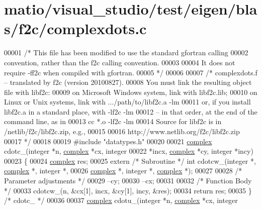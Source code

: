 \hypertarget{matio_2visual__studio_2test_2eigen_2blas_2f2c_2complexdots_8c_source}{}\section{matio/visual\+\_\+studio/test/eigen/blas/f2c/complexdots.c}
\label{matio_2visual__studio_2test_2eigen_2blas_2f2c_2complexdots_8c_source}

\begin{DoxyCode}
00001 \textcolor{comment}{/* This file has been modified to use the standard gfortran calling}
00002 \textcolor{comment}{   convention, rather than the f2c calling convention.}
00003 \textcolor{comment}{}
00004 \textcolor{comment}{   It does not require -ff2c when compiled with gfortran.}
00005 \textcolor{comment}{*/}
00006 
00007 \textcolor{comment}{/* complexdots.f -- translated by f2c (version 20100827).}
00008 \textcolor{comment}{   You must link the resulting object file with libf2c:}
00009 \textcolor{comment}{    on Microsoft Windows system, link with libf2c.lib;}
00010 \textcolor{comment}{    on Linux or Unix systems, link with .../path/to/libf2c.a -lm}
00011 \textcolor{comment}{    or, if you install libf2c.a in a standard place, with -lf2c -lm}
00012 \textcolor{comment}{    -- in that order, at the end of the command line, as in}
00013 \textcolor{comment}{        cc *.o -lf2c -lm}
00014 \textcolor{comment}{    Source for libf2c is in /netlib/f2c/libf2c.zip, e.g.,}
00015 \textcolor{comment}{}
00016 \textcolor{comment}{        http://www.netlib.org/f2c/libf2c.zip}
00017 \textcolor{comment}{*/}
00018 
00019 \textcolor{preprocessor}{#include "datatypes.h"}
00020 
00021 \hyperlink{structcomplex}{complex} cdotc\_(integer *n, \hyperlink{structcomplex}{complex} *cx, integer 
00022     *incx, \hyperlink{structcomplex}{complex} *cy, integer *incy)
00023 \{
00024     \hyperlink{structcomplex}{complex} res;
00025     \textcolor{keyword}{extern} \textcolor{comment}{/* Subroutine */} \textcolor{keywordtype}{int} cdotcw\_(integer *, \hyperlink{structcomplex}{complex} *, integer *, 
00026         \hyperlink{structcomplex}{complex} *, integer *, \hyperlink{structcomplex}{complex} *);
00027 
00028     \textcolor{comment}{/* Parameter adjustments */}
00029     --cy;
00030     --cx;
00031 
00032     \textcolor{comment}{/* Function Body */}
00033     cdotcw\_(n, &cx[1], incx, &cy[1], incy, &res);
00034     \textcolor{keywordflow}{return} res;
00035 \} \textcolor{comment}{/* cdotc\_ */}
00036 
00037 \hyperlink{structcomplex}{complex} cdotu\_(integer *n, \hyperlink{structcomplex}{complex} *cx, integer 

\end{DoxyCode}
